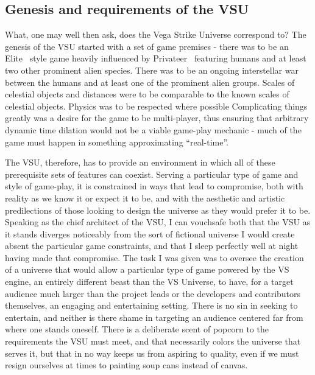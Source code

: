 \subsection{Genesis and requirements of the VSU}
What, one may well then ask, does the Vega Strike Universe correspond
to? The genesis of the VSU started with a set of game premises - there
was to be an Elite~\cite{Elite} style game heavily influenced by
Privateer~\cite{Privateer} featuring humans and at least two other
prominent alien species. There was to be an ongoing interstellar war
between the humans and at least one of the prominent alien
groups. Scales of celestial objects and distances were to be
comparable to the known scales of celestial objects. Physics was to be
respected where possible Complicating things greatly was a desire for
the game to be multi-player, thus ensuring that arbitrary dynamic time
dilation would not be a viable game-play mechanic - much of the game
must happen in something approximating ``real-time''.




\label{Danny's stuff goes here}




The VSU, therefore, has to provide an environment in which all of
these prerequisite sets of features can coexist. Serving a particular
type of game and style of game-play, it is constrained in ways that
lead to compromise, both with reality as we know it or expect it to
be, and with the aesthetic and artistic predilections of those looking
to design the universe as they would prefer it to be. Speaking as the
chief architect of the VSU, I can vouchsafe both that the VSU as it
stands diverges noticeably from the sort of fictional universe I would
create absent the particular game constraints, and that I sleep
perfectly well at night having made that compromise. The task I was
given was to oversee the creation of a universe that would allow a
particular type of game powered by the VS engine, an entirely
different beast than the VS Universe, to have, for a target audience
much larger than the project leads or the developers and contributors
themselves, an engaging and entertaining setting. There is no sin in
seeking to entertain, and neither is there shame in targeting an
audience centered far from where one stands oneself. There is a
deliberate scent of popcorn to the requirements the VSU must meet, and
that necessarily colors the universe that serves it, but that in no
way keeps us from aspiring to quality, even if we must resign
ourselves at times to painting soup cans instead of canvas.

